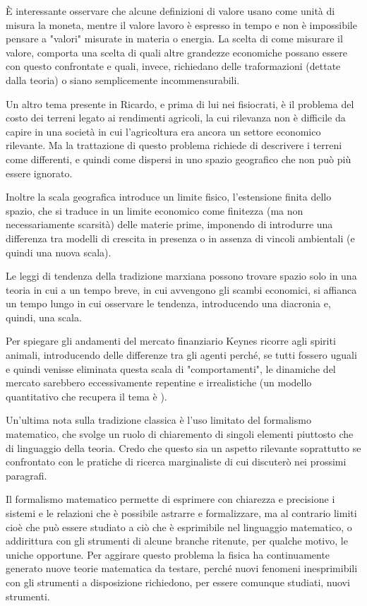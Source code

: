 \documentclass[a4paper, headings=standardclasses]{scrartcl}
\begin{document}
È interessante osservare che alcune definizioni di valore usano come unità di misura la moneta, mentre il valore lavoro è espresso in tempo e non è impossibile pensare a "valori" misurate in materia o energia. La scelta di come misurare il valore, comporta una scelta di quali altre grandezze economiche possano essere con questo confrontate e quali, invece, richiedano delle traformazioni (dettate dalla teoria) o siano semplicemente incommensurabili.

Un altro tema presente in Ricardo, e prima di lui nei fisiocrati, è il problema del costo dei terreni legato ai rendimenti agricoli, la cui rilevanza non è difficile da capire in una società in cui l'agricoltura era ancora un settore economico rilevante. Ma la trattazione di questo problema richiede di descrivere i terreni come differenti, e quindi come dispersi in uno spazio geografico che non può più essere ignorato.

Inoltre la scala geografica introduce un limite fisico, l'estensione finita dello spazio, che si traduce in un limite economico come finitezza (ma non necessariamente scarsità) delle materie prime, imponendo di introdurre una differenza tra modelli di crescita in presenza o in assenza di vincoli ambientali (e quindi una nuova scala).

Le leggi di tendenza della tradizione marxiana possono trovare spazio solo in una teoria in cui a un tempo breve, in cui avvengono gli scambi economici, si affianca un tempo lungo in cui osservare le tendenza, introducendo una diacronia e, quindi, una scala.

Per spiegare gli andamenti del mercato finanziario Keynes ricorre agli spiriti animali, introducendo delle differenze tra gli agenti perché, se tutti fossero uguali e quindi venisse eliminata questa scala di "comportamenti", le dinamiche del mercato sarebbero eccessivamente repentine e irrealistiche (un modello quantitativo che recupera il tema è \textcite{day1990}).

Un'ultima nota sulla tradizione classica è l'uso limitato del formalismo matematico, che svolge un ruolo di chiaremento di singoli elementi piuttosto che di linguaggio della teoria. Credo che questo sia un aspetto rilevante soprattutto se confrontato con le pratiche di ricerca marginaliste di cui discuterò nei prossimi paragrafi.

Il formalismo matematico permette di esprimere con chiarezza e precisione i sistemi e le relazioni che è possibile astrarre e formalizzare, ma al contrario limiti cioè che può essere studiato a ciò che è esprimibile nel linguaggio matematico, o addirittura con gli strumenti di alcune branche ritenute, per qualche motivo, le uniche opportune.
Per aggirare questo problema la fisica ha continuamente generato nuove teorie matematica da testare, perché nuovi fenomeni inesprimibili con gli strumenti a disposizione richiedono, per essere comunque studiati, nuovi strumenti.
\end{document}
